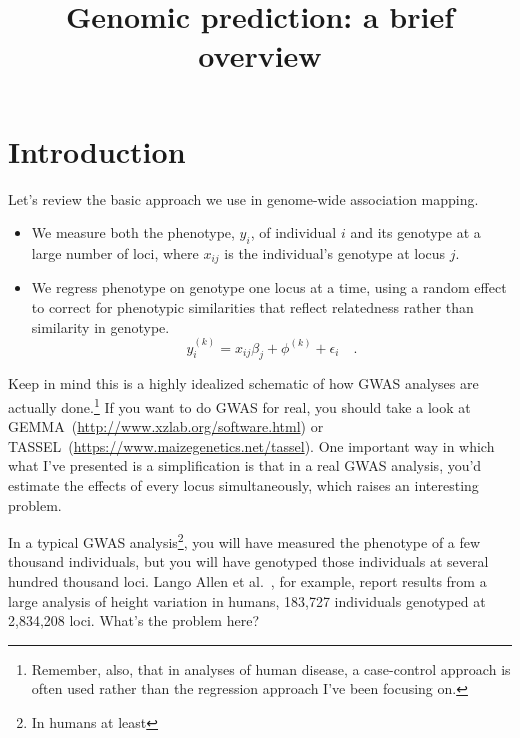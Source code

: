 \documentclass[12pt]{article}
\title{Genomic prediction: a brief overview}
\begin{document}
\maketitle

\thispagestyle{first}

\section*{Introduction}

Let's review the basic approach we use in genome-wide association
mapping.

\begin{itemize}

\item We measure both the phenotype, $y_i$, of individual $i$ and its
  genotype at a large number of loci, where $x_{ij}$ is the
  individual's genotype at locus $j$.

\item We regress phenotype on genotype one locus at a time, using a
  random effect to correct for phenotypic similarities that reflect
  relatedness rather than similarity in genotype. 
\[
y_i^{(k)} = x_{ij}\beta_j + \phi^{(k)} + \epsilon_i \quad .
\]

\end{itemize}

Keep in mind this is a highly idealized schematic of how GWAS analyses
are actually done.\footnote{Remember, also, that in analyses of human
  disease, a case-control approach is often used rather than the
  regression approach I've been focusing on.} If you want to do GWAS
for real, you should take a look at
GEMMA~(\url{http://www.xzlab.org/software.html}) or
TASSEL~(\url{https://www.maizegenetics.net/tassel}). One
important way in which what I've presented is a simplification is that
in a real GWAS analysis, you'd estimate the effects of every locus
simultaneously, which raises an interesting problem.

In a typical GWAS analysis\footnote{In humans at least}, you will have
measured the phenotype of a few thousand individuals, but you will
have genotyped those individuals at several hundred thousand
loci. Lango Allen et al.~\cite{LangoAllen-etal-2010}, for example,
report results from a large analysis of height variation in humans,
183,727 individuals genotyped at 2,834,208 loci. What's the problem
here?
\end{document}
